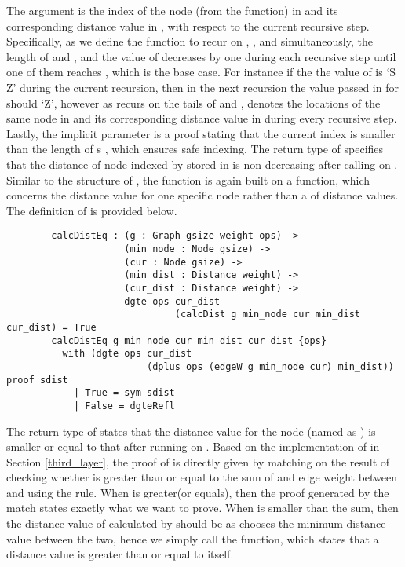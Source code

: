 The  argument is the index of the node (from the  function) in  and its corresponding distance value in , with respect to the current recursive step. Specifically, as we define the  function to recur on , , and  simultaneously, the length of  and , and the value of  decreases by one during each recursive step until one of them reaches , which is the base case. For instance if the the value of  is `S Z' during the current recursion, then in the next recursion the value passed in for  should `Z', however as  recurs on the tails of  and ,  denotes the locations of the same node in  and its corresponding distance value in  during every recursive step. Lastly, the implicit parameter  is a proof stating that the current index  is smaller than the length of s , which ensures safe indexing. The return type of  specifies that the distance of node indexed by  stored in  is non-decreasing after calling  on . 
\\

Similar to the structure of , the  function is again built on a  function, which concerns the distance value for one specific node rather than a  of distance values. The definition of  is provided below. 
\begin{lstlisting}
		calcDistEq : (g : Graph gsize weight ops) ->
		             (min_node : Node gsize) ->
		             (cur : Node gsize) ->
		             (min_dist : Distance weight) ->
		             (cur_dist : Distance weight) ->
		             dgte ops cur_dist 
		             		  (calcDist g min_node cur min_dist cur_dist) = True
		calcDistEq g min_node cur min_dist cur_dist {ops}
		  with (dgte ops cur_dist 
		  				 (dplus ops (edgeW g min_node cur) min_dist)) proof sdist
		    | True = sym sdist
		    | False = dgteRefl
\end{lstlisting}

The return type of  states that the distance value for the node  (named as ) is smaller or equal to that after running  on . Based on the implementation of  in Section \ref{third_layer}, the proof of  is directly given by matching on the result of checking whether  is greater than or equal to the sum of  and edge weight between  and  using the  rule. When  is greater(or equals), then the proof  generated by the match states exactly what we want to prove. When  is smaller than the sum, then the distance value of  calculated by  should be  as  chooses the minimum distance value between the two, hence we simply call the  function, which states that a distance value is greater than or equal to itself. 
\\

